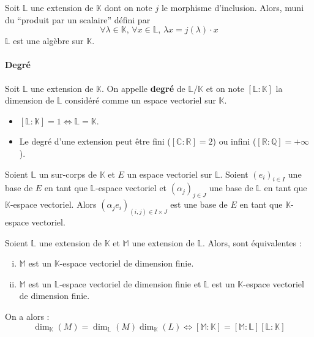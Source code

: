 	\begin{proposition}
		Soit $\mathbb{L}$ une extension de $\mathbb{K}$ dont on note $j$ le morphisme d'inclusion. Alors, muni du ``produit par un scalaire'' défini par
		\[ \forall \lambda \in \mathbb{K}, \, \forall x \in \mathbb{L}, \, \lambda x = j(\lambda) \cdot x \]
		$\mathbb{L}$ est une algèbre sur $\mathbb{K}$.
	\end{proposition}

	\paragraph{Degré}

	\begin{definition}
		Soit $\mathbb{L}$ une extension de $\mathbb{K}$. On appelle \textbf{degré} de $\mathbb{L}/\mathbb{K}$ et on note $[\mathbb{L}:\mathbb{K}]$ la dimension de $\mathbb{L}$ considéré comme un espace vectoriel sur $\mathbb{K}$.
	\end{definition}

	\begin{remark}
		\begin{itemize}
			\item $[\mathbb{L}:\mathbb{K}] = 1 \iff \mathbb{L} = \mathbb{K}$.
			\item Le degré d'une extension peut être fini ($[\mathbb{C}:\mathbb{R}] = 2$) ou infini ($[\mathbb{R}:\mathbb{Q}] = +\infty$).
		\end{itemize}
	\end{remark}

	\begin{theorem}
		Soient $\mathbb{L}$ un sur-corps de $\mathbb{K}$ et $E$ un espace vectoriel sur $\mathbb{L}$.
		Soient $(e_i)_{i \in I}$ une base de $E$ en tant que $\mathbb{L}$-espace vectoriel et $(\alpha_j)_{j \in J}$ une base de $\mathbb{L}$ en tant que $\mathbb{K}$-espace vectoriel.
		\newpar
		Alors $(\alpha_j e_i)_{(i,j) \in I \times J}$ est une base de $E$ en tant que $\mathbb{K}$-espace vectoriel.
	\end{theorem}

	\begin{corollary}
		Soient $\mathbb{L}$ une extension de $\mathbb{K}$ et $\mathbb{M}$ une extension de $\mathbb{L}$. Alors, sont équivalentes :
		\begin{enumerate}[(i)]
			\item $\mathbb{M}$ est un $\mathbb{K}$-espace vectoriel de dimension finie.
			\item $\mathbb{M}$ est un $\mathbb{L}$-espace vectoriel de dimension finie et $\mathbb{L}$ est un $\mathbb{K}$-espace vectoriel de dimension finie.
		\end{enumerate}
		On a alors :
		\[ \dim_{\mathbb{K}}(M) = \dim_{\mathbb{L}}(M) \dim_{\mathbb{K}}(L) \iff [\mathbb{M}:\mathbb{K}] = [\mathbb{M}:\mathbb{L}] [\mathbb{L}:\mathbb{K}] \]
	\end{corollary}


